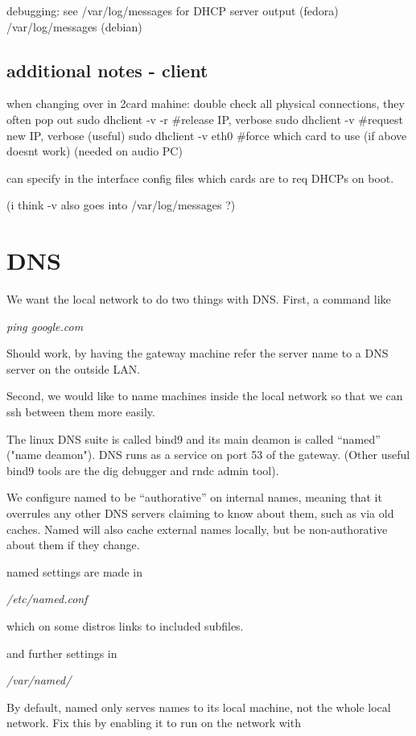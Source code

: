 \documentclass[oneside,english]{scrbook}
\begin{document}
debugging: see /var/log/messages for DHCP server output (fedora)
           /var/log/messages   (debian)

\subsection{additional notes - client}

when changing over in 2card mahine:
    double check all physical connections, they often pop out
    sudo dhclient -v -r   #release IP, verbose
    sudo dhclient -v      #request new IP, verbose (useful)
    sudo dhclient -v eth0     #force which card to use (if above doesnt work) (needed on audio PC)

can specify in the interface config files which cards are to req DHCPs on boot.

(i think -v also goes into /var/log/messages ?)



\section{DNS}

We want the local network to do two things with DNS. First, a command
like

\emph{ping google.com}

Should work, by having the gateway machine refer the server name to
a DNS server on the outside LAN.

Second, we would like to name machines inside the local network so
that we can ssh between them more easily.

The linux DNS suite is called bind9 and its main deamon is called
``named'' ("name deamon"). DNS runs as a service on port 53 of the gateway. (Other
useful bind9 tools are the dig debugger and rndc admin tool).

We configure named to be ``authorative'' on internal names, meaning
that it overrules any other DNS servers claiming to know about them,
such as via old caches. Named will also cache external names locally,
but be non-authorative about them if they change.

named settings are made in

\emph{/etc/named.conf}

which on some distros links to included subfiles.

and further settings in

\emph{/var/named/}

By default, named only serves names to its local machine, not the
whole local network. Fix this by enabling it to run on the network
with
\end{document}
